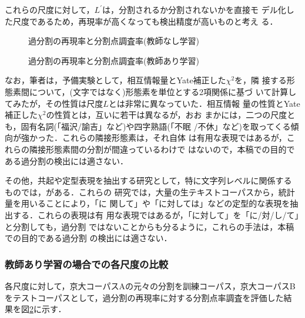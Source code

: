これらの尺度に対して，$L^\prime$は，分割されるか分割されないかを直接モ
デル化した尺度であるため，再現率が高くなっても検出精度が高いものと考え
る．

\begin{figure}[htbp]
  \begin{center}
\vspace{4mm}
\vspace{1mm}
    \caption{過分割の再現率と分割点調査率(教師なし学習)}
    \label{fig:unsup-cmp}
  \end{center}
\end{figure}


\begin{figure}[htbp]
  \begin{center}
\vspace{3mm}
\vspace{1mm}
    \caption{過分割の再現率と分割点調査率(教師あり学習)}
    \label{fig:sup-cmp}
  \end{center}
\end{figure}
\vspace{-3mm}
なお，筆者は，予備実験として，相互情報量とYate補正した$\chi^{2}$を，隣
接する形態素間について，(文字ではなく)形態素を単位とする2項関係に基づ
いて計算してみたが，その性質は尺度$L$とは非常に異なっていた．相互情報
量の性質とYate補正した$\chi^{2}$の性質とは，互いに若干は異なるが，おお
まかには，二つの尺度とも，固有名詞(「福沢/諭吉」など)や四字熟語(「不眠
/不休」など)を取ってくる傾向が強かった．これらの隣接形態素は，それ自体
は有用な表現ではあるが，これらの隣接形態素間の分割が間違っているわけで
はないので，本稿での目的である過分割の検出には適さない．

その他，共起や定型表現を抽出する研究として，特に文字列レベルに関係する
ものでは，\cite[など]{shiNnou95,ikehara95,shimohata95}がある．これらの
研究では，大量の生テキストコーパスから，統計量を用いることにより，「に
関して」や「に対しては」などの定型的な表現を抽出する．これらの表現は有
用な表現ではあるが，「に対して」を「に/対/し/て」と分割しても，過分割
ではないことからも分るように，これらの手法は，本稿での目的である過分割
の検出には適さない．

\subsubsection*{教師あり学習の場合での各尺度の比較}

各尺度に対して，京大コーパスAの元々の分割を訓練コーパス，京大コーパスB
をテストコーパスとして，過分割の再現率に対する分割点率調査を評価した結
果を図\ref{fig:sup-cmp}に示す．

